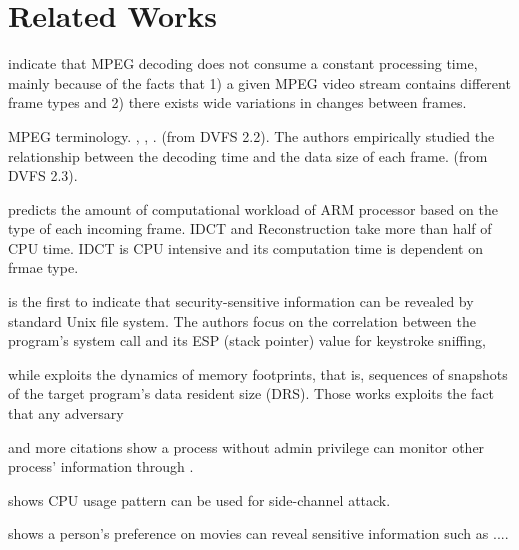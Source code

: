 \section{Related Works}
\label{sec:relatedworks}

\cite{Bavier98predictingmpeg}\cite{DVFS} indicate that MPEG\cite{MPEG} decoding does not consume a constant processing time, mainly because of the facts that 1) a given MPEG video stream contains different frame types and 2) there exists wide variations in changes between frames. 

\cite{MPEG} MPEG terminology. , , . (from DVFS 2.2). 
The authors empirically studied the relationship between the decoding time and the data size of each frame.  (from DVFS 2.3). 

\cite{DVFS}  predicts the amount of computational workload of ARM processor based on the type of each incoming frame.
IDCT and Reconstruction take more than half of CPU time. 
IDCT is CPU intensive and its computation time is dependent on frmae type.



\cite{Zhang:2009} is the first to indicate that security-sensitive information can be revealed by standard Unix  file system. 
The authors focus on the correlation between the program's system call and its ESP (stack pointer) value for keystroke sniffing, 

while  exploits the dynamics of memory footprints, that is, sequences of snapshots of the target program's data resident size (DRS).
Those works exploits the fact that any adversary 

and more citations show a process without admin privilege can monitor other process' information through . 

shows CPU usage pattern can be used for side-channel attack. 

shows a person's preference on movies can reveal sensitive information such as ....
